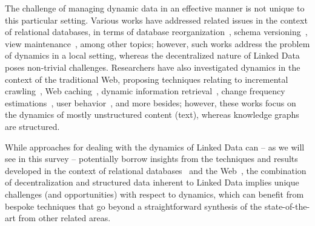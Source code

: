 \documentclass[sw]{iosart2x}
\begin{document}
The challenge of managing dynamic data in an effective manner is not unique to this particular setting. Various works have addressed related issues in the context of relational databases, in terms of database reorganization~\cite{LernerH90}, schema versioning~\cite{Roddick95}, view maintenance~\cite{GuptaM95}, among other topics; however, such works address the problem of dynamics in a local setting, whereas the decentralized nature of Linked Data poses non-trivial challenges. Researchers have also investigated dynamics in the context of the traditional Web, proposing techniques relating to incremental crawling~\cite{ChoG00}, Web caching~\cite{GaddeCR01}, dynamic information retrieval~\cite{RisvikM02}, change frequency estimations~\cite{ChoG03}, user behavior~\cite{AlmeidaMC07}, and more besides; however, these works focus on the dynamics of mostly unstructured content (text), whereas knowledge graphs are structured.

While approaches for dealing with the dynamics of Linked Data can -- as we will see in this survey -- potentially borrow insights from the techniques and results developed in the context of relational databases~\cite{LernerH90,Roddick95,GuptaM95} and the Web~\cite{ChoG00,GaddeCR01,RisvikM02,ChoG03,AlmeidaMC07}, the combination of decentralization and structured data inherent to Linked Data implies unique challenges (and opportunities) with respect to dynamics, which can benefit from bespoke techniques that go beyond a straightforward synthesis of the state-of-the-art from other related areas.
\medskip
\end{document}
